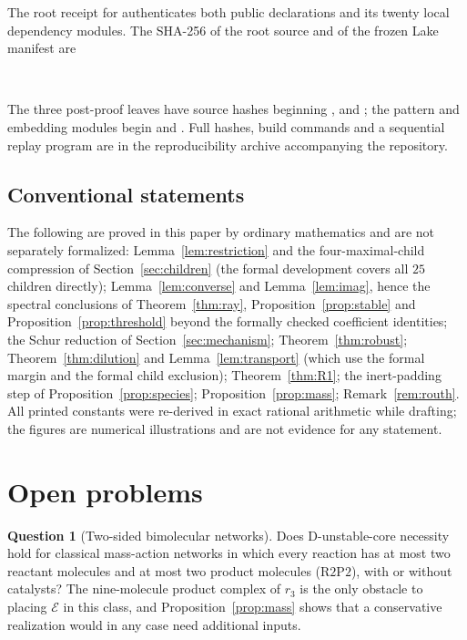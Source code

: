 \documentclass[11pt,a4paper]{article}
\theoremstyle{plain}
\theoremstyle{definition}
\newtheorem{question}[theorem]{Question}
\theoremstyle{remark}
\newcommand{\Rpp}{\mathrm{R2P2}}
\begin{document}
The root receipt for  authenticates both public declarations and its twenty local dependency modules. The SHA-256 of the root source and of the frozen Lake manifest are
\begin{center}\small
{}\\
\end{center}
The three post-proof leaves have source hashes beginning ,  and ; the pattern and embedding modules begin  and . Full hashes, build commands and a sequential replay program are in the reproducibility archive accompanying the repository.

\subsection{Conventional statements}

The following are proved in this paper by ordinary mathematics and are not separately formalized: Lemma~\ref{lem:restriction} and the four-maximal-child compression of Section~\ref{sec:children} (the formal development covers all $25$ children directly); Lemma~\ref{lem:converse} and Lemma~\ref{lem:imag}, hence the spectral conclusions of Theorem~\ref{thm:ray}, Proposition~\ref{prop:stable} and Proposition~\ref{prop:threshold} beyond the formally checked coefficient identities; the Schur reduction of Section~\ref{sec:mechanism}; Theorem~\ref{thm:robust}; Theorem~\ref{thm:dilution} and Lemma~\ref{lem:transport} (which use the formal margin and the formal child exclusion); Theorem~\ref{thm:R1}; the inert-padding step of Proposition~\ref{prop:species}; Proposition~\ref{prop:mass}; Remark~\ref{rem:routh}. All printed constants were re-derived in exact rational arithmetic while drafting; the figures are numerical illustrations and are not evidence for any statement.

\section{Open problems}\label{sec:open}

\begin{question}[Two-sided bimolecular networks]
Does D-unstable-core necessity hold for classical mass-action networks in which every reaction has at most two reactant molecules and at most two product molecules ($\Rpp$), with or without catalysts? The nine-molecule product complex of $r_3$ is the only obstacle to placing $\mathcal E$ in this class, and Proposition~\ref{prop:mass} shows that a conservative realization would in any case need additional inputs.
\end{question}
\end{document}
